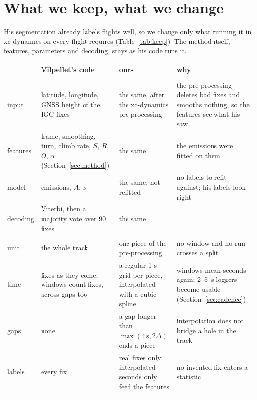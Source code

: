 \section{What we keep, what we change}\label{sec:keep}

His segmentation already labels flights well, so we change only what running it in xc-dynamics on
every flight requires (Table~\ref{tab:keep}). The method itself, features, parameters and
decoding, stays as his code runs it.

\begin{table}
\centering
\small
\renewcommand{\arraystretch}{1.15}
\begin{tabularx}{\textwidth}{@{}>{\raggedright}p{2.3cm} >{\raggedright}X >{\raggedright}X >{\raggedright\arraybackslash}p{4.1cm}@{}}
\toprule
 & Vilpellet's code & ours & why \\
\midrule
\multicolumn{4}{@{}l}{\textit{kept}} \\
input & latitude, longitude, GNSS height of the IGC fixes & the same, after the xc-dynamics pre-processing & the pre-processing deletes bad fixes and smooths nothing, so the features see what his saw \\ \addlinespace
features & frame, smoothing, turn, climb rate, $S$, $R$, $O$, $\alpha$ (Section~\ref{sec:method}) & the same & the emissions were fitted on them \\ \addlinespace
model & emissions, $A$, $\nu$ & the same, not refitted & no labels to refit against; his labels look right \\ \addlinespace
decoding & Viterbi, then a majority vote over 90 fixes & the same & \\ \addlinespace
\multicolumn{4}{@{}l}{\textit{changed or added}} \\
unit & the whole track & one piece of the pre-processing & no window and no run crosses a split \\ \addlinespace
time & fixes as they come; windows count fixes, across gaps too & a regular 1-s grid per piece, interpolated with a cubic spline & windows mean seconds again; 2--5~s loggers become usable (Section~\ref{sec:cadence}) \\ \addlinespace
gaps & none & a gap longer than $\max(4\,\mathrm{s},2\Delta)$ ends a piece & interpolation does not bridge a hole in the track \\ \addlinespace
labels & every fix & real fixes only; interpolated seconds only feed the features & no invented fix enters a statistic \\ \addlinespace

\end{tabularx}
\end{table}
